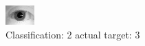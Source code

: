 \begin{figure}[h!]
\begin{center}
\includegraphics[width=0.60\columnwidth]{figures/ID1034_class_2_target_3.png}
\end{center}
\caption{ Classification: 2 actual target: 3}
\label{fig:ID1034_class_2_target_3}
\end{figure}
